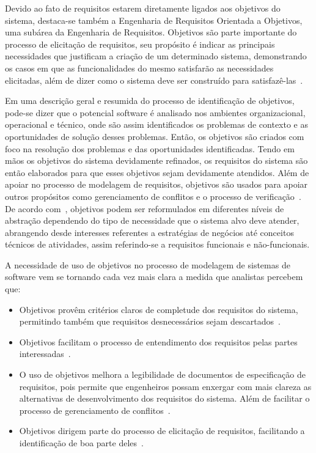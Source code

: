 Devido ao fato de requisitos estarem diretamente ligados aos objetivos do sistema, destaca-se também a Engenharia de Requisitos Orientada a Objetivos, uma subárea da Engenharia de Requisitos. Objetivos são parte importante do processo de elicitação de requisitos, seu propósito é indicar as principais necessidades que justificam a criação de um determinado sistema, demonstrando os casos em que as funcionalidades do mesmo satisfarão as necessidades elicitadas, além de dizer como o sistema deve ser construído para satisfazê-las~\cite{ross1977structured}. 

Em uma descrição geral e resumida do processo de identificação de objetivos, pode-se dizer que o potencial software é analisado nos ambientes organizacional, operacional e técnico, onde são assim identificados os problemas de contexto e as oportunidades de solução desses problemas. Então, os objetivos são criados com foco na resolução dos problemas e das oportunidades identificadas. Tendo em mãos os objetivos do sistema devidamente refinados, os requisitos do sistema são então elaborados para que esses objetivos sejam devidamente atendidos. Além de apoiar no processo de modelagem de requisitos, objetivos são usados para apoiar outros propósitos como gerenciamento de conflitos e o processo de verificação~\cite{lapouchnian2005goal}. De acordo com~\cite{van2001goal}, objetivos podem ser reformulados em diferentes níveis de abstração dependendo do tipo de necessidade que o sistema alvo deve atender, abrangendo desde interesses referentes a estratégias de negócios até conceitos técnicos de atividades, assim referindo-se a requisitos funcionais e não-funcionais.

A necessidade de uso de objetivos no processo de modelagem de sistemas de software vem se tornando cada vez mais clara a medida que analistas percebem que:
\begin{itemize}
	\item Objetivos provêm critérios claros de completude dos requisitos do sistema, permitindo também que requisitos desnecessários sejam descartados~\cite{van2001goal}.
	
	\item Objetivos facilitam o processo de entendimento dos requisitos pelas partes interessadas~\cite{van2001goal}.
	
	\item O uso de objetivos melhora a legibilidade de documentos de especificação de requisitos, pois permite que engenheiros possam enxergar com mais clareza as alternativas de desenvolvimento dos requisitos do sistema. Além de facilitar o processo de gerenciamento de conflitos~\cite{van2001goal}.
	
	\item Objetivos dirigem parte do processo de elicitação de requisitos, facilitando a identificação de boa parte deles~\cite{lapouchnian2005goal}.	
\end{itemize}

